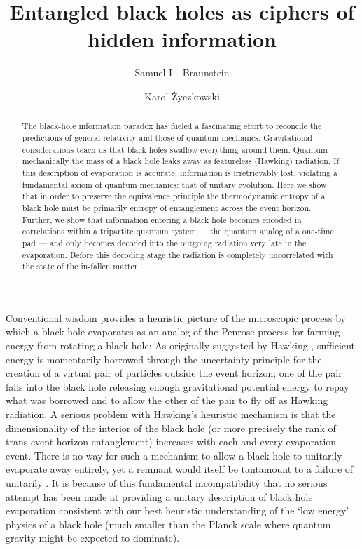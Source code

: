 \documentclass[aps,12pt]{revtex4}
\begin{document}
\title{Entangled black holes as ciphers of hidden information}

\author{Samuel L.\ Braunstein}
\author{Karol \.{Z}yczkowski}

\begin{abstract}
The black-hole information paradox has fueled a fascinating effort to
reconcile the predictions of general relativity and those of quantum
mechanics. Gravitational considerations teach us that black holes swallow
everything around them. Quantum mechanically the mass of a black hole leaks
away as featureless (Hawking) radiation. If this
description of evaporation is accurate, information is irretrievably lost,
violating a fundamental axiom of quantum mechanics: that of unitary
evolution. Here we show that in order to preserve the
equivalence principle the thermodynamic entropy of a black hole must
be primarily entropy of entanglement across the event horizon.
Further, we show that information entering a black hole becomes encoded
in correlations within a tripartite quantum system --- the quantum analog
of a one-time pad --- and only becomes decoded into
the outgoing radiation very late in the evaporation. Before this decoding
stage the radiation is completely uncorrelated with the state of the
in-fallen matter.
\end{abstract}

\maketitle

Conventional wisdom provides a heuristic picture of the microscopic
process by which a black hole evaporates as an analog of the Penrose
process \cite{Penrose69} for farming energy from rotating a black hole:
As originally suggested by Hawking \cite{Hawking75}, sufficient energy
is momentarily borrowed through the uncertainty principle for the
creation of a virtual pair of particles outside the event horizon;
one of the pair falls into the black hole releasing enough
gravitational potential energy to repay what was borrowed and to
allow the other of the pair to fly off as Hawking radiation. A
serious problem with Hawking's heuristic mechanism is that the
dimensionality of the interior of the black hole (or more precisely
the rank of trans-event horizon entanglement) increases with each and
every evaporation event. There is no way for such a mechanism to
allow a black hole to unitarily evaporate away entirely, yet a
remnant would itself be tantamount to a failure of
unitarily \cite{Giddings95}. It is because of this fundamental
incompatibility that no serious attempt has been made at providing
a unitary description of black hole evaporation consistent with our
best heuristic understanding of the `low energy' physics of a
black hole (much smaller than the Planck scale where quantum gravity
might be expected to dominate).
\end{document}
